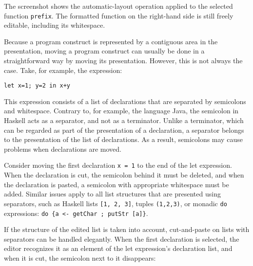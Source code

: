 \documentclass{speauth}
\begin{document}
The screenshot shows the automatic-layout operation applied to the selected function {\tt prefix}. The formatted function on the right-hand side is still freely editable, including its whitespace.


Because a program construct is represented by a contiguous area in the presentation, moving a program construct can usually be done in a straightforward way by moving its presentation. However, this is not always the case. Take, for example, the expression:
\begin{verbatim}
let x=1; y=2 in x+y
\end{verbatim}
This expression consists of a list of declarations that are separated by semicolons and whitespace. Contrary to, for example, the language Java, the semicolon in Haskell acts as a separator, and not as a terminator. Unlike a terminator, which can be regarded as part of the presentation of a declaration, a separator belongs to the presentation of the list of declarations. As a result, semicolons may cause problems when declarations are moved.

Consider moving the first declaration \verb|x = 1| to the end of the let expression. When the declaration is cut, the semicolon behind it must be deleted, and when the declaration is pasted, a semicolon with appropriate whitespace must be added. Similar issues apply to all list structures that are presented using separators, such as Haskell lists \verb|[1, 2, 3]|, tuples \verb|(1,2,3)|, or monadic \verb|do| expressions: \verb|do {a <- getChar ; putStr [a]}|.

\newcommand{\focus}{\vrule height2ex width0.5pt depth0.8ex}

If the structure of the edited list is taken into account, cut-and-paste on lists with separators can be handled elegantly. When the first declaration is selected, the editor recognizes it as an element of the let expression's declaration list, and when it is cut, the semicolon next to it disappears:
\end{document}
